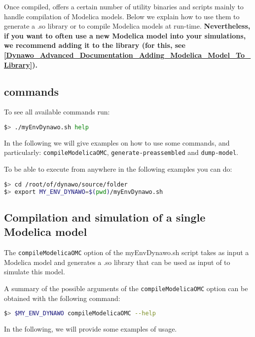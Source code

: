 \documentclass[a4paper, 12pt]{report}
\begin{document}
Once compiled, \Dynawo offers a certain number of utility binaries and scripts
mainly to handle compilation of Modelica models. Below we explain how to use
them to generate a .so library or to compile Modelica models at run-time.
\textbf{Nevertheless, if you want to often use a new Modelica model into your simulations, we recommend adding it to the \Dynawo library (for this, see \ref{Dynawo_Advanced_Documentation_Adding_Modelica_Model_To_Library}).} \\

\subsection{\Dynawo commands}

To see all available \Dynawo commands run:
\begin{lstlisting}[language=bash,deletekeywords={jobs,help}]
$> ./myEnvDynawo.sh help
\end{lstlisting}

In the following we will give examples on how to use some commands, and particularly: \lstinline[language=bash]{compileModelicaOMC}, \lstinline[language=bash]{generate-preassembled} and \lstinline[language=bash]{dump-model}.

To be able to execute \Dynawo from anywhere in the following examples you can do:
\begin{lstlisting}[language=bash,deletekeywords={help,source}]
$> cd /root/of/dynawo/source/folder
$> export MY_ENV_DYNAWO=$(pwd)/myEnvDynawo.sh
\end{lstlisting}

\subsection{Compilation and simulation of a single Modelica model}

The \lstinline[language=bash]{compileModelicaOMC} option of the myEnvDynawo.sh script takes as input a Modelica model and generates a .so library that can be used as input of \Dynawo to simulate this model.

A summary of the possible arguments of the \lstinline[language=bash]{compileModelicaOMC} option can be obtained with the following
command:
\begin{lstlisting}[language=bash,deletekeywords={jobs,help}]
$> $MY_ENV_DYNAWO compileModelicaOMC --help
\end{lstlisting}

In the following, we will provide some examples of usage.
\end{document}
